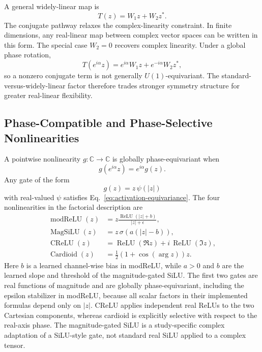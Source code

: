 A general widely-linear map is
\begin{equation}
T(z)=W_1z+W_2z^*.
\label{eq:widely-linear-form}
\end{equation}
The conjugate pathway relaxes the complex-linearity constraint. In finite dimensions, any real-linear map between complex vector spaces can be written in this form. The special case $W_2=0$ recovers complex linearity. Under a global phase rotation,
\begin{equation}
T(e^{i\alpha}z)=e^{i\alpha}W_1z+e^{-i\alpha}W_2z^*,
\end{equation}
so a nonzero conjugate term is not generally $U(1)$-equivariant. The standard-versus-widely-linear factor therefore trades stronger symmetry structure for greater real-linear flexibility.

\subsection{Phase-Compatible and Phase-Selective Nonlinearities}
A pointwise nonlinearity $g:\mathbb{C}\rightarrow\mathbb{C}$ is globally phase-equivariant when
\begin{equation}
g(e^{i\alpha}z)=e^{i\alpha}g(z).
\label{eq:activation-equivariance}
\end{equation}
Any gate of the form
\begin{equation}
g(z)=z\,\psi(|z|)
\end{equation}
with real-valued $\psi$ satisfies Eq.~\eqref{eq:activation-equivariance}. The four nonlinearities in the factorial description are
\begin{align}
\operatorname{modReLU}(z)&=z\frac{\operatorname{ReLU}(|z|+b)}{|z|+\epsilon},\\
\operatorname{MagSiLU}(z)&=z\,\sigma\!\left(a(|z|-b)\right),\\
\operatorname{CReLU}(z)&=\operatorname{ReLU}(\Re z)+i\,\operatorname{ReLU}(\Im z),\\
\operatorname{Cardioid}(z)&=\frac{1}{2}\left(1+\cos(\arg z)\right)z.
\end{align}
Here $b$ is a learned channel-wise bias in modReLU, while $a>0$ and $b$ are the learned slope and threshold of the magnitude-gated SiLU. The first two gates are real functions of magnitude and are globally phase-equivariant, including the epsilon stabilizer in modReLU, because all scalar factors in their implemented formulas depend only on $|z|$. CReLU applies independent real ReLUs to the two Cartesian components, whereas cardioid is explicitly selective with respect to the real-axis phase. The magnitude-gated SiLU is a study-specific complex adaptation of a SiLU-style gate, not standard real SiLU applied to a complex tensor.

